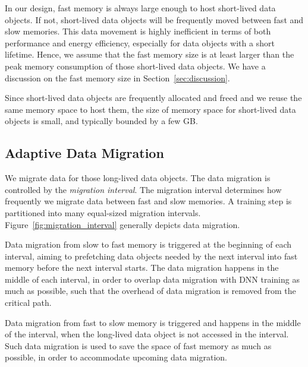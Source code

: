 In our design, fast memory is always large enough to host short-lived data objects. If not, short-lived data objects will be frequently moved between fast and slow memories. This data movement is highly inefficient in terms of both performance and energy efficiency, especially for data objects with a short lifetime. Hence, we assume that the fast memory size is at least larger than the peak memory consumption of those short-lived data objects. We have a discussion on the fast memory size in Section~\ref{sec:discussion}.  

Since short-lived data objects are frequently allocated and freed and we reuse the same memory space to host them, the size of memory space for short-lived data objects is small, and typically bounded by a few GB. 

\vspace{-5pt}
\subsection{Adaptive Data Migration}
\label{sec:adaptive_dm}


We migrate data for those long-lived data objects. %
The data migration is controlled by the \textit{migration interval}. The migration interval determines how frequently we migrate data between fast and slow memories. A training step is partitioned into many equal-sized
migration intervals. Figure~\ref{fig:migration_interval} generally depicts data migration.

Data migration from slow to fast memory is triggered at the beginning of each interval, aiming to prefetching data objects needed by the next interval into fast memory before the next interval starts. The data migration happens in the middle of each interval, in order to overlap data migration with DNN training as much as possible, such that the overhead of data migration is removed from the critical path. 

Data migration from fast to slow memory is triggered and happens in the middle of the interval, when the long-lived data object is not accessed in the interval. Such data migration is used to save the space of fast memory as much as possible, in order to accommodate upcoming data migration. %

